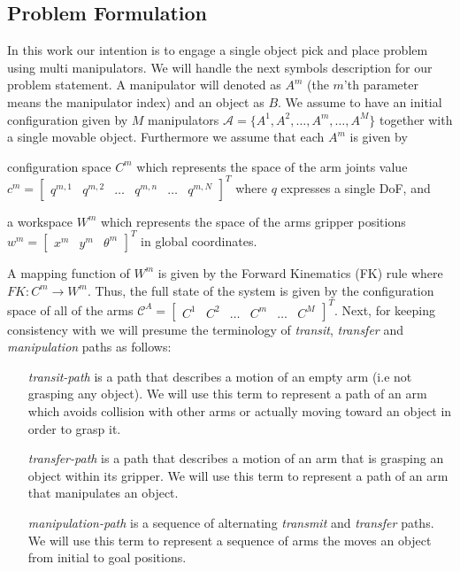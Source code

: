 \documentclass[english]{article}
\theoremstyle{definition}
\begin{document}
\subsection{Problem Formulation}
In this work our intention is to engage a single object pick and place problem using multi manipulators. We will handle the next symbols description for our problem statement. A manipulator will denoted as $A^{m}$ (the $m$'th parameter means the manipulator index) and an object as $B$. We assume to have an initial configuration given by $M$ manipulators  $\mathcal{A}=\{A^{1},A^{2},\dots,A^m, \dots,A^{M}\}$ together with a single movable object. Furthermore we assume that each $A^m$ is given by
\begin{inparaenum}
\item configuration space $C^{m}$ which represents the space of the arm joints value $c^{m} = \begin{bmatrix} q^{m,1} & q^{m,2} & \dots & q^{m,n} & \dots & q^{m,N} \end{bmatrix}^T$ where $q$ expresses a single DoF, and
\item a workspace $W^m$ which represents the space of the arms gripper positions $w^m= \begin{bmatrix} x^m & y^m & \theta^m \end{bmatrix}^T$ in global coordinates.
\end{inparaenum}  
A mapping function of $W^m$ is given by the Forward Kinematics (FK) rule where $FK:C^m\rightarrow W^m$. Thus, the full state of the system is given by the configuration space of all of the arms $\mathcal{C}^A=\begin{bmatrix} C^1 & C^2 & \dots & C^m & \dots & C^M\end{bmatrix}^T$. Next, for keeping consistency with \cite{koga1994multi,koga1992} we will presume the terminology of \textit{transit}, \textit{transfer} and \textit{manipulation} paths as follows:
\begin{itemize}
\item[\textit{transit-path}] is a path that describes a motion of an empty arm (i.e not grasping any object). We will use this term to represent a path of an arm which avoids collision with other arms or actually moving toward an object in order to grasp it.

\item[\textit{transfer-path}] is a path that describes a motion of an arm that is grasping an object within its gripper. We will use this term to represent a path of an arm that manipulates an object.

\item[\textit{manipulation-path}]  is a sequence of alternating \textit{transmit} and \textit{transfer} paths. We will use this term to represent a sequence of arms the moves an object from initial to goal positions.
\end{itemize}
\end{document}
